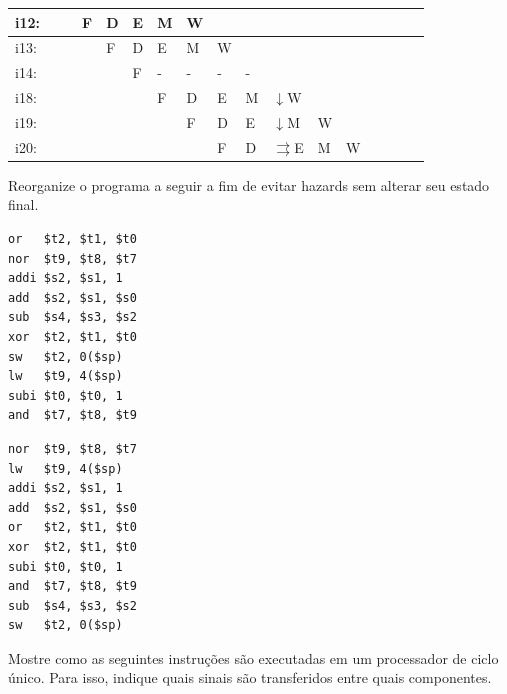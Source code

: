 \documentclass{article}
\begin{document}
\begin{table}[H]
\begin{tabular}{|l|l|l|l|l|l|l|l|l|l|l|l|l|l|l|l|l|}
i12: &     &     &  F  &  D  &  E  &  M  &  W  &     &     &     &     &     &     &     &     &     \\ \hline
i13: &     &     &     &  F  &  D  &  E  &  M  &  W  &     &     &     &     &     &     &     &     \\ \hline
i14: &     &     &     &     &  F  &  -  &  -  &  -  &  -  &     &     &     &     &     &     &     \\ \hline
i18: &     &     &     &     &     &  F  &  D  &  E  &  M  &$\downarrow$W  &     &     &     &     &     &     \\ \hline
i19: &     &     &     &     &     &     &  F  &  D  &  E  &$\downarrow$M  &  W  &     &     &     &     &     \\ \hline
i20: &     &     &     &     &     &     &     &  F  &  D  &$\rightrightarrows$E  &  M  &  W  &     &     &     &     \\ \hline
\end{tabular}
\end{table}

{\large Reorganize o programa a seguir a fim de evitar hazards sem alterar seu estado final.}

\begin{center}
    \begin{minipage}{0.25\textwidth}
        \begin{lstlisting}[frame=single]
or   $t2, $t1, $t0
nor  $t9, $t8, $t7
addi $s2, $s1, 1
add  $s2, $s1, $s0
sub  $s4, $s3, $s2
xor  $t2, $t1, $t0
sw   $t2, 0($sp)
lw   $t9, 4($sp)
subi $t0, $t0, 1
and  $t7, $t8, $t9
        \end{lstlisting}
    \end{minipage}
\end{center}

\begin{center}
    \begin{minipage}{0.25\textwidth}
        \begin{lstlisting}[frame=single]
nor  $t9, $t8, $t7
lw   $t9, 4($sp)
addi $s2, $s1, 1
add  $s2, $s1, $s0
or   $t2, $t1, $t0
xor  $t2, $t1, $t0
subi $t0, $t0, 1
and  $t7, $t8, $t9
sub  $s4, $s3, $s2
sw   $t2, 0($sp)
        \end{lstlisting}
    \end{minipage}
\end{center}

{\large Mostre como as seguintes instruções são executadas em um processador de ciclo único. Para isso, indique quais sinais são transferidos entre quais componentes.}
\end{document}
